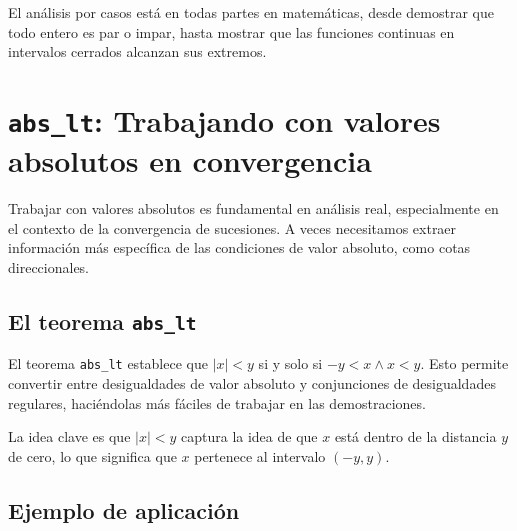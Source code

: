El análisis por casos está en todas partes en matemáticas, desde demostrar
que todo entero es par o impar, hasta mostrar que las funciones continuas
en intervalos cerrados alcanzan sus extremos.

\section{\texttt{abs\_lt}: Trabajando con valores absolutos en convergencia}

Trabajar con valores absolutos es fundamental en análisis real,
especialmente en el contexto de la convergencia de sucesiones. A veces
necesitamos extraer información más específica de las condiciones de valor
absoluto, como cotas direccionales.

\subsection{El teorema \texttt{abs\_lt}}

El teorema \texttt{abs\_lt} establece que $|x| < y$ si y solo si
$-y < x \wedge x < y$. Esto permite convertir entre desigualdades de valor
absoluto y conjunciones de desigualdades regulares, haciéndolas más fáciles
de trabajar en las demostraciones.

La idea clave es que $|x| < y$ captura la idea de que $x$ está dentro de
la distancia $y$ de cero, lo que significa que $x$ pertenece al intervalo
$(-y, y)$.

\subsection{Ejemplo de aplicación}

